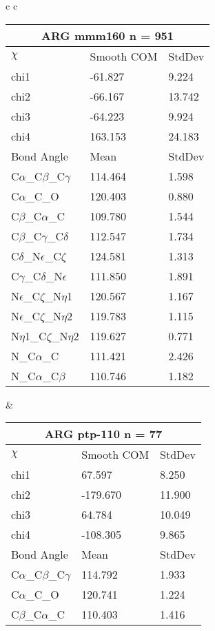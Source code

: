 \begin{longtable}{ c c }
  \\
  \begin{tabular}{ l l l }
  \toprule
  \multicolumn{3}{c}{ARG \textbf{mmm160} n = 951} \\ \toprule
  $\chi$       & Smooth COM & StdDev \\ \midrule
  chi1 & -61.827 & 9.224 \\ 
  chi2 & -66.167 & 13.742 \\ 
  chi3 & -64.223 & 9.924 \\ 
  chi4 & 163.153 & 24.183 \\ \midrule
  Bond Angle   & Mean     & StdDev \\ \midrule
  C$\alpha$\_C$\beta$\_C$\gamma$ & 114.464 & 1.598\\
  C$\alpha$\_C\_O & 120.403 & 0.880\\
  C$\beta$\_C$\alpha$\_C & 109.780 & 1.544\\
  C$\beta$\_C$\gamma$\_C$\delta$ & 112.547 & 1.734\\
  C$\delta$\_N$\epsilon$\_C$\zeta$ & 124.581 & 1.313\\
  C$\gamma$\_C$\delta$\_N$\epsilon$ & 111.850 & 1.891\\
  N$\epsilon$\_C$\zeta$\_N$\eta$1 & 120.567 & 1.167\\
  N$\epsilon$\_C$\zeta$\_N$\eta$2 & 119.783 & 1.115\\
  N$\eta$1\_C$\zeta$\_N$\eta$2 & 119.627 & 0.771\\
  N\_C$\alpha$\_C & 111.421 & 2.426\\
  N\_C$\alpha$\_C$\beta$ & 110.746 & 1.182\\
  \bottomrule
  \end{tabular}
  &
  \begin{tabular}{ l l l }
  \toprule
  \multicolumn{3}{c}{ARG \textbf{ptp-110} n = 77} \\ \toprule
  $\chi$       & Smooth COM & StdDev \\ \midrule
  chi1 & 67.597 & 8.250 \\ 
  chi2 & -179.670 & 11.900 \\ 
  chi3 & 64.784 & 10.049 \\ 
  chi4 & -108.305 & 9.865 \\ \midrule
  Bond Angle   & Mean     & StdDev \\ \midrule
  C$\alpha$\_C$\beta$\_C$\gamma$ & 114.792 & 1.933\\
  C$\alpha$\_C\_O & 120.741 & 1.224\\
  C$\beta$\_C$\alpha$\_C & 110.403 & 1.416\\

\end{tabular}
\end{longtable}
